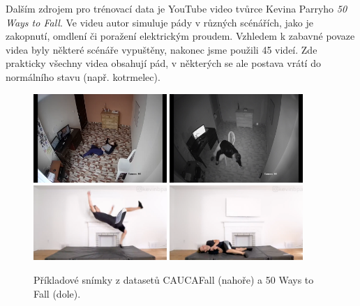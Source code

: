 Dalším zdrojem pro trénovací data je YouTube video tvůrce Kevina Parryho
\textit{50 Ways to Fall}. Ve videu autor simuluje pády v různých scénářích,
jako je zakopnutí, omdlení či poražení elektrickým proudem. Vzhledem k zabavné
povaze videa byly některé scénáře vypuštěny, nakonec jsme použili 45 videí. Zde
prakticky všechny videa obsahují pád, v některých se ale postava vrátí do
normálního stavu (např. kotrmelec).

\begin{figure}[]
    \centering
    \includegraphics[width=0.45\textwidth]{Figures/datasets_examples/cauca1.png}
    \includegraphics[width=0.45\textwidth]{Figures/datasets_examples/cauca2.png}
    \includegraphics[width=0.45\textwidth]{Figures/datasets_examples/fifty1.png}
    \includegraphics[width=0.45\textwidth]{Figures/datasets_examples/fifty2.png}
    \caption{Příkladové snímky z datasetů CAUCAFall (nahoře) a 50 Ways to Fall (dole).}
    \label{fig:datasets_examples}
\end{figure}


